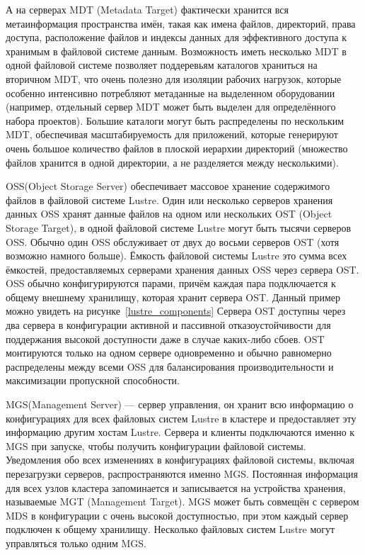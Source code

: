 А на серверах MDT (Metadata Target) фактически хранится вся метаинформация пространства имён, такая как имена файлов, директорий,
права доступа, расположение файлов и индексы данных для эффективного доступа к хранимым в файловой системе данным.
Возможность иметь несколько MDT в одной файловой системе позволяет поддеревьям каталогов храниться на вторичном
MDT, что очень полезно для изоляции рабочих нагрузок, которые особенно интенсивно потребляют метаданные на
выделенном оборудовании (например, отдельный сервер MDT может быть выделен для определённого набора проектов).
Большие каталоги могут быть распределены по нескольким MDT, обеспечивая масштабируемость для приложений,
которые генерируют очень большое количество файлов в плоской иерархии директорий (множество файлов хранится в одной директории, а не разделяется между несколькими).

OSS(Object Storage Server) обеспечивает массовое хранение содержимого файлов в файловой системе Lustre. Один или несколько серверов хранения
данных OSS хранят данные файлов на одном или нескольких OST (Object Storage Target), в одной файловой системе Lustre могут быть тысячи 
серверов OSS. Обычно один OSS обслуживает от двух до восьми серверов OST (хотя возможно намного больше).
Ёмкость файловой системы Lustre это сумма всех ёмкостей, предоставляемых серверами хранения данных OSS через сервера OST.
OSS обычно конфигурируются парами, причём каждая пара подключается к общему внешнему хранилищу, которая
хранит сервера OST. Данный пример можно увидеть на рисунке~\ref{lustre_components}
Сервера OST доступны через два сервера в конфигурации активной и пассивной отказоустойчивости
для поддержания высокой доступности даже в случае каких-либо сбоев. OST монтируются только на одном сервере
одновременно и обычно равномерно распределены между всеми OSS для балансирования производительности и
максимизации пропускной способности.


MGS(Management Server) --- сервер управления, он хранит всю информацию о конфигурациях для всех файловых систем Lustre в кластере и
предоставляет эту информацию другим хостам Lustre. Сервера и клиенты подключаются именно к MGS при запуске,
чтобы получить конфигурации файловой системы. Уведомления обо всех изменениях в конфигурациях файловой системы,
включая перезагрузки серверов, распространяются именно MGS.
Постоянная информация для всех узлов кластера запоминается и записывается на устройства хранения, называемые MGT (Management Target).
MGS может быть совмещён с сервером MDS в конфигурации с очень высокой доступностью, при этом каждый сервер
подключен к общему хранилищу. Несколько файловых систем Lustre могут управляться только одним MGS.


